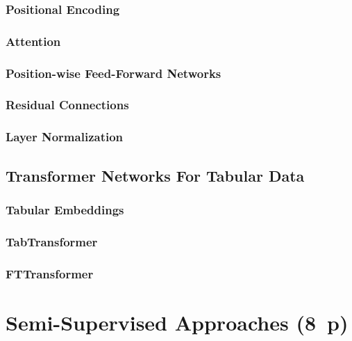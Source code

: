 \subsubsection{Positional Encoding}\label{sec:positional-encoding}

\subsubsection{Attention}\label{sec:attention}

\subsubsection{Position-wise Feed-Forward Networks}\label{sec:position-wise-ffn}

\subsubsection{Residual Connections}\label{sec:residual-connections}

\subsubsection{Layer Normalization}\label{sec:layer-norm}

\subsection{Transformer Networks For Tabular Data}\label{sec:tabular-transformer}

\subsubsection{Tabular Embeddings}\label{sec:tabular-embeddings}

\subsubsection{TabTransformer}\label{sec:tabtransformer}

\subsubsection{FTTransformer}\label{sec:fttransformer}


\newpage
\section{Semi-Supervised Approaches (8~p)}\label{sec:semi-supervised-approaches}


